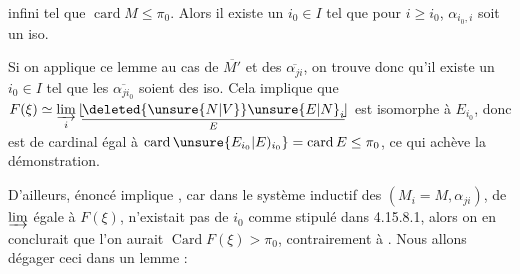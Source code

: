 
infini tel que $\operatorname{card} M\leq\pi_0$. Alors il existe un $i_0\in I$ tel que pour  $i\geq i_0$, $\alpha_{i_0,i}$ soit un iso.

Si on applique ce lemme au cas de $\overline{M'}$ et des $\overline{\alpha_{ji}}$, on trouve donc qu'il existe un $i_0\in I$ tel que les $\overline{\alpha_{ji_0}}$ soient des iso. Cela implique que
$F(\xi)\simeq\underset{i}{\varinjlim}\,\underset{E}{\lfloor\!\underline{\deleted{\unsure{N|V}}\unsure{E|N}_i}\!\rfloor}$ est isomorphe à $E_{i_0}$, donc est de cardinal égal à $\operatorname{card} \unsure{E_{i_0}|E)_{i_0}}=\operatorname{card} E\leq\pi_0$, ce qui achève la démonstration.

D'ailleurs, énoncé  implique , car dans le système inductif des $(M_i=M,\alpha_{ji})$, de $\varinjlim$ égale à $F(\xi)$,  n'existait pas de $i_0$ comme stipulé dans
4.15.8.1, alors on en conclurait  que l'on aurait $\operatorname{Card} F(\xi)>\pi_0$, contrairement à . Nous allons dégager ceci dans un lemme :
